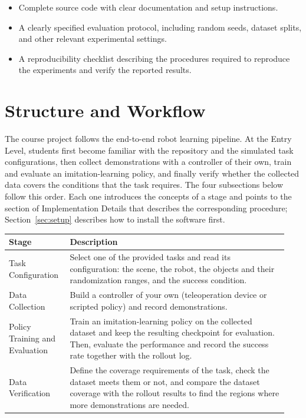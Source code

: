 \documentclass[11pt]{article}
\begin{document}
\begin{itemize}
  \item Complete source code with clear documentation and setup instructions.
  \item A clearly specified evaluation protocol, including random seeds, dataset splits, and other relevant experimental settings.
  \item A reproducibility checklist describing the procedures required to reproduce the experiments and verify the reported results.
\end{itemize}



\section{Structure and Workflow}
\label{sec:structure-workflow}

The course project follows the end-to-end robot learning pipeline. At the Entry Level, students first become familiar with the repository and the simulated task configurations, then collect demonstrations with a controller of their own, train and evaluate an imitation-learning policy, and finally verify whether the collected data covers the conditions that the task requires. The four subsections below follow this order. Each one introduces the concepts of a stage and points to the section of Implementation Details that describes the corresponding procedure; Section~\ref{sec:setup} describes how to install the software first.

\begin{longtable}{L{0.20\linewidth}L{0.74\linewidth}}
\toprule
\textbf{Stage} & \textbf{Description} \\
\midrule
Task Configuration & Select one of the provided tasks and read its configuration: the scene, the robot, the objects and their randomization ranges, and the success condition. \\
Data Collection & Build a controller of your own (teleoperation device or scripted policy) and record demonstrations. \\
Policy Training and Evaluation & Train an imitation-learning policy on the collected dataset and keep the resulting checkpoint for evaluation. Then, evaluate the performance and record the success rate together with the rollout log. \\
Data Verification & Define the coverage requirements of the task, check the dataset meets them or not, and compare the dataset coverage with the rollout results to find the regions where more demonstrations are needed. \\
\bottomrule
\end{longtable}
\end{document}

